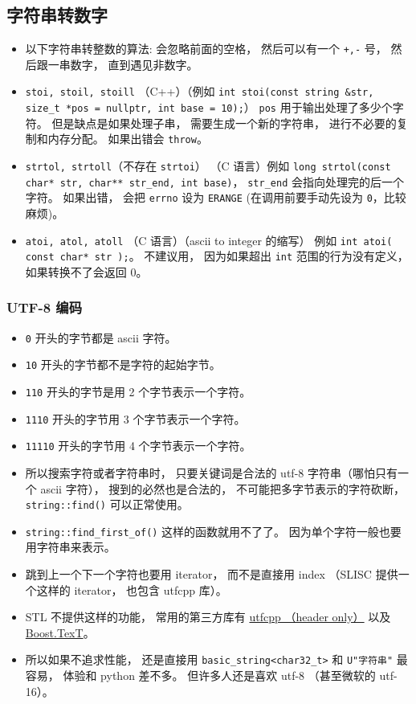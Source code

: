 \subsection{字符串转数字}
\begin{itemize}
\item 以下字符串转整数的算法: 会忽略前面的空格， 然后可以有一个 \verb|+,-| 号， 然后跟一串数字， 直到遇见非数字。
\item \verb|stoi, stoil, stoill| （C++）（例如 \verb|int stoi(const string &str, size_t *pos = nullptr, int base = 10);|） \verb|pos| 用于输出处理了多少个字符。 但是缺点是如果处理子串， 需要生成一个新的字符串， 进行不必要的复制和内存分配。 如果出错会 \verb|throw|。
\item \verb|strtol, strtoll|（不存在 \verb|strtoi|） （C 语言）例如 \verb|long strtol(const char* str, char** str_end, int base)|， \verb|str_end| 会指向处理完的后一个字符。 如果出错， 会把 \verb|errno| 设为 \verb|ERANGE| (在调用前要手动先设为 \verb|0|，比较麻烦)。
\item \verb|atoi, atol, atoll| （C 语言）（ascii to integer 的缩写） 例如 \verb|int atoi( const char* str );|。 不建议用， 因为如果超出 \verb|int| 范围的行为没有定义， 如果转换不了会返回 0。
\end{itemize}


\subsubsection{UTF-8 编码}
\begin{itemize}
\item \verb|0| 开头的字节都是 ascii 字符。
\item \verb|10| 开头的字节都不是字符的起始字节。
\item \verb|110| 开头的字节是用 2 个字节表示一个字符。
\item \verb|1110| 开头的字节用 3 个字节表示一个字符。
\item \verb|11110| 开头的字节用 4 个字节表示一个字符。
\item 所以搜索字符或者字符串时， 只要关键词是合法的 utf-8 字符串（哪怕只有一个 ascii 字符）， 搜到的必然也是合法的， 不可能把多字节表示的字符砍断， \verb|string::find()| 可以正常使用。
\item \verb|string::find_first_of()| 这样的函数就用不了了。 因为单个字符一般也要用字符串来表示。
\item 跳到上一个下一个字符也要用 iterator， 而不是直接用 index （SLISC 提供一个这样的 iterator， 也包含 utfcpp 库）。
\item STL 不提供这样的功能， 常用的第三方库有 \href{https://github.com/nemtrif/utfcpp}{utfcpp （header only）} 以及 \href{https://tzlaine.github.io/text/doc/html/index.html}{Boost.TexT}。
\item 所以如果不追求性能， 还是直接用 \verb|basic_string<char32_t>| 和 \verb|U"字符串"| 最容易， 体验和 python 差不多。 但许多人还是喜欢 utf-8 （甚至微软的 utf-16）。
\end{itemize}


